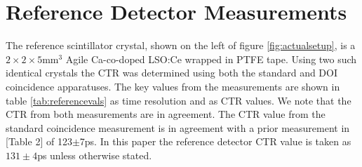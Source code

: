 \section{Reference Detector Measurements}
\label{sec:reference}
The reference scintillator crystal, shown on the left of figure \ref{fig:actualsetup}, is a $2\times2\times5$mm$^3$ Agile Ca-co-doped LSO:Ce wrapped in PTFE tape. Using two such identical crystals the CTR was determined using both the standard and DOI coincidence apparatuses. The key values from the measurements are shown in table \ref{tab:referencevals} as time resolution and as CTR values. We note that the CTR from both measurements are in agreement. The CTR value from the standard coincidence measurement is in agreement with a prior measurement in [Table 2]\cite{uffray_Jarron_Meyer_Lecoq_2014} of 123$\pm$7ps. In this paper the reference detector CTR value is taken as $131\pm4$ps unless otherwise stated.
